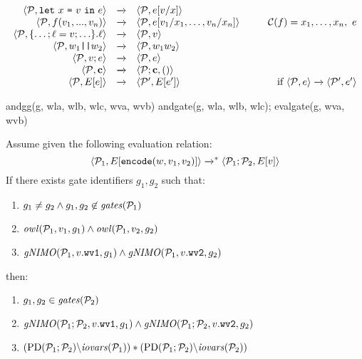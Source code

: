 $$
\begin{array}{rcl@{\hspace{10mm}}r}
\config{\prog}{\elet{x}{v}{e}} &\redx& \config{\prog}{e[v/x]}\\
\config{\prog}{f(v_1,...,v_n)} &\redx&
\config{\prog}{e[v_1/x_1,\ldots,v_n/x_n]} & 
 \codebase(f) = x_1,\ldots,x_n,\ e\\
\config{\prog}{\{\ldots; \flab = v; \ldots\}.\flab} &\redx&
 \config{\prog}{v}\\
 \config{\prog}{w_1\ttt{||}w_2} &\redx& \config{\prog}{w_1w_2}\\
 \config{\prog}{v;e} &\redx& \config{\prog}{e}\\
\config{\prog}{\instr} &\redx& \config{\prog;\instr}{()}\\
\config{\prog}{E[e]} &\redx& \config{\prog'}{E[e']} & \text{if}\ \config{\prog}{e} \redx \config{\prog'}{e'} 
\end{array}
$$

\begin{verbatimtab}
andgg(g, wla, wlb, wlc, wva, wvb) {
andgate(g, wla, wlb, wlc);
evalgate(g, wva, wvb)
}
\end{verbatimtab}

\begin{lemma}
Assume given the following evaluation relation:
$$
\langle \mathcal{P}_1,E[\texttt{encode}(w,v_1,v_2)] \rangle \xrightarrow{}^{*} \langle \mathcal{P}_1;\mathcal{P}_2,E[v] \rangle
$$
If there exists gate identifiers $g_1, g_2$ such that:
\begin{enumerate}
  \item $g_1 \ne g_2 \wedge g_1,g_2 \not\in \mathit{gates}(\mathcal{P}_1)$
  \item $\mathit{owl}(\mathcal{P}_1,v_1,g_1) \wedge \mathit{owl}(\mathcal{P}_1,v_2,g_2)$
  \item $\mathit{gNIMO}(\mathcal{P}_1,v.\texttt{wv1},g_1) \wedge \mathit{gNIMO}(\mathcal{P}_1,v.\texttt{wv2},g_2)$
\end{enumerate}
then:
\begin{enumerate}
\item $g_1,g_2 \in  \mathit{gates}(\mathcal{P}_2)$
\item $\mathit{gNIMO}(\mathcal{P}_1;\mathcal{P}_2,v.\texttt{wv1},g_1) \wedge \mathit{gNIMO}(\mathcal{P}_1;\mathcal{P}_2,v.\texttt{wv2},g_2)$
\item $(\mathrm{PD}(\mathcal{P}_1;\mathcal{P}_2)\backslash\mathit{iovars}(\mathcal{P}_1)) * (\mathrm{PD}(\mathcal{P}_1;\mathcal{P}_2)\backslash\mathit{iovars}(\mathcal{P}_2))$
\end{enumerate}
\end{lemma}

